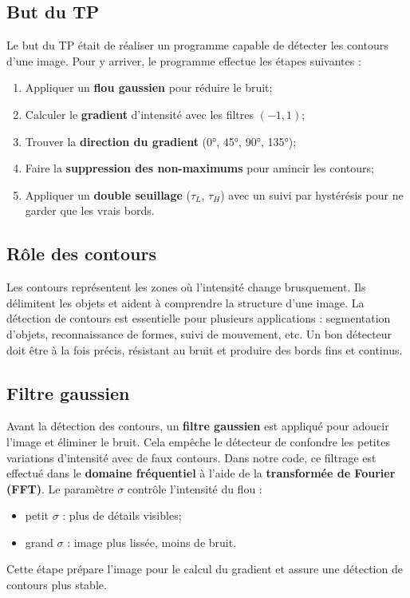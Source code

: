 \documentclass{article}
\begin{document}
\subsection{But du TP}
Le but du TP était de réaliser un programme capable de détecter les contours d’une image.  
Pour y arriver, le programme effectue les étapes suivantes :
\begin{enumerate}
    \item Appliquer un \textbf{flou gaussien} pour réduire le bruit;
    \item Calculer le \textbf{gradient} d’intensité avec les filtres \((-1,1)\);
    \item Trouver la \textbf{direction du gradient} (0°, 45°, 90°, 135°);
    \item Faire la \textbf{suppression des non-maximums} pour amincir les contours;
    \item Appliquer un \textbf{double seuillage} (\(\tau_L\), \(\tau_H\)) avec un suivi par hystérésis pour ne garder que les vrais bords.
\end{enumerate}

\subsection{Rôle des contours}
Les contours représentent les zones où l’intensité change brusquement.  
Ils délimitent les objets et aident à comprendre la structure d’une image.  
La détection de contours est essentielle pour plusieurs applications : segmentation d’objets, reconnaissance de formes, suivi de mouvement, etc.  
Un bon détecteur doit être à la fois précis, résistant au bruit et produire des bords fins et continus.

\subsection{Filtre gaussien}
Avant la détection des contours, un \textbf{filtre gaussien} est appliqué pour adoucir l’image et éliminer le bruit.  
Cela empêche le détecteur de confondre les petites variations d’intensité avec de faux contours.  
Dans notre code, ce filtrage est effectué dans le \textbf{domaine fréquentiel} à l’aide de la \textbf{transformée de Fourier (FFT)}.  
Le paramètre \(\sigma\) contrôle l’intensité du flou :
\begin{itemize}
    \item petit \(\sigma\) : plus de détails visibles;
    \item grand \(\sigma\) : image plus lissée, moins de bruit.
\end{itemize}
Cette étape prépare l’image pour le calcul du gradient et assure une détection de contours plus stable.
\end{document}
